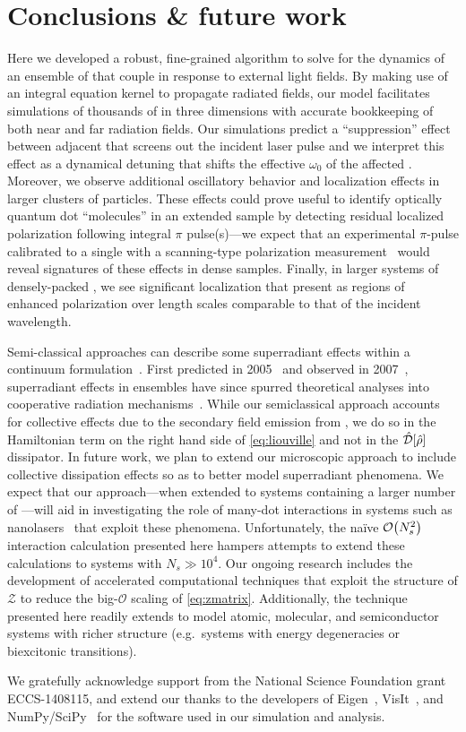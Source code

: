 \section{\label{section:conclusion}Conclusions \& future work}
Here we developed a robust, fine-grained algorithm to solve for the dynamics of an ensemble of \qds{} that couple in response to external light fields.
By making use of an integral equation kernel to propagate radiated fields, our model facilitates simulations of thousands of \qds{} in three dimensions with accurate bookkeeping of both near and far radiation fields.
Our simulations predict a ``suppression'' effect between adjacent \qds{} that screens out the incident laser pulse and we interpret this effect as a dynamical detuning that shifts the effective $\omega_0$ of the affected \qds{}.
Moreover, we observe additional oscillatory behavior and localization effects in larger clusters of particles.
These effects could prove useful to identify optically quantum dot ``molecules'' in an extended sample by detecting residual localized polarization following integral $\pi$ pulse(s)---we expect that an experimental $\pi$-pulse calibrated to a single \qd{} with a scanning-type polarization measurement~\cite{Asakura2013} would reveal signatures of these effects in dense samples.
Finally, in larger systems of densely-packed \qds{}, we see significant localization that present as regions of enhanced polarization over length scales comparable to that of the incident wavelength.

Semi-classical approaches can describe some superradiant effects within a continuum formulation~\cite{Gross1982,PhysRevA.4.302,PhysRevA.4.854}.
First predicted in 2005~\cite{Temnov2005} and observed in 2007~\cite{Scheibner2007}, superradiant effects in \qd{} ensembles have since spurred theoretical analyses into cooperative radiation mechanisms~\cite{Temnov2009,Chen2008}.
While our semiclassical approach accounts for collective effects due to the secondary field emission from \qds{}, we do so in the Hamiltonian term on the right hand side of \cref{eq:liouville} and not in the $\hat{\mathcal{D}}\qty[\hat{\rho}]$ dissipator.
In future work, we plan to extend our microscopic approach to include collective dissipation effects so as to better model superradiant phenomena.
We expect that our approach---when extended to systems containing a larger number of \qds{}---will aid in investigating the role of many-dot interactions in systems such as nanolasers~\cite{jahnke2016giant} that exploit these phenomena.
Unfortunately, the na\"ive $\mathcal{O}\qty(N_s^2)$ interaction calculation presented here hampers attempts to extend these calculations to systems with $N_s \gg 10^4$.
Our ongoing research includes the development of accelerated computational techniques that exploit the structure of $\mathcal{Z}$ to reduce the big-$\mathcal{O}$ scaling of \cref{eq:zmatrix}.
Additionally, the technique presented here readily extends to model atomic, molecular, and semiconductor systems with richer structure (e.g.\ systems with energy degeneracies or biexcitonic transitions).

\acknowledgments
We gratefully acknowledge support from the National Science Foundation grant ECCS-1408115, and extend our thanks to the developers of Eigen~\cite{Eigen}, VisIt~\cite{VisIt}, and NumPy/SciPy~\cite{NumPy,SciPy} for the software used in our simulation and analysis.
\vspace{.5 cm}
